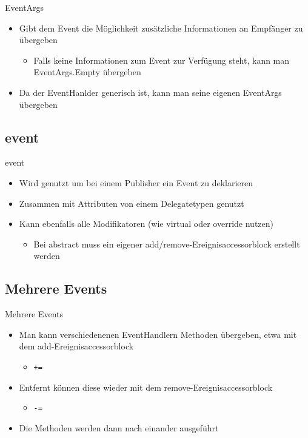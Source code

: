 \begin{frame}{EventArgs}
	\begin{itemize}
		\item Gibt dem Event die Möglichkeit zusätzliche Informationen an Empfänger zu übergeben
		\begin{itemize}
			\item Falls keine Informationen zum Event zur Verfügung steht, kann man \alert{EventArgs.Empty} übergeben
		\end{itemize}
		\item Da der EventHanlder generisch ist, kann man seine eigenen \alert{EventArgs} übergeben
	\end{itemize}
	
\end{frame}

\subsection{event}
\begin{frame}{event}
	\begin{itemize}
		\item Wird genutzt um bei einem Publisher ein Event zu deklarieren
		\item Zusammen mit Attributen von einem Delegatetypen genutzt
		\item Kann ebenfalls alle Modifikatoren (wie \alert{virtual} oder \alert{override} nutzen)
		\begin{itemize}
			\item Bei \alert{abstract} muss ein eigener add/remove-Ereignisaccessorblock erstellt werden
		\end{itemize}
	\end{itemize}				
	
\end{frame}

\subsection{Mehrere Events}
\begin{frame}{Mehrere Events}
	\begin{itemize}
		\item Man kann verschiedenenen EventHandlern Methoden übergeben, etwa mit dem add-Ereignisaccessorblock
			\begin{itemize}
				\item \texttt{\alert{+=}}
			\end{itemize}
		\item Entfernt können diese wieder mit dem remove-Ereignisaccessorblock
			\begin{itemize}
				\item \texttt{\alert{-=}}
			\end{itemize}		
		\item Die Methoden werden dann nach einander ausgeführt
	\end{itemize}
\end{frame}

